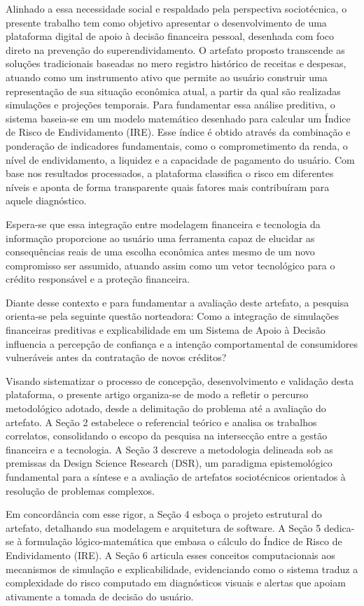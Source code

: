 \documentclass[portuguese]{sbc2025}%
\begin{document}
Alinhado a essa necessidade social e respaldado pela perspectiva sociotécnica, o presente trabalho tem como objetivo apresentar o desenvolvimento de uma plataforma digital de apoio à decisão financeira pessoal, desenhada com foco direto na prevenção do superendividamento. O artefato proposto transcende as soluções tradicionais baseadas no mero registro histórico de receitas e despesas, atuando como um instrumento ativo que permite ao usuário construir uma representação de sua situação econômica atual, a partir da qual são realizadas simulações e projeções temporais.
Para fundamentar essa análise preditiva, o sistema baseia-se em um modelo matemático desenhado para calcular um Índice de Risco de Endividamento (IRE). Esse índice é obtido através da combinação e ponderação de indicadores fundamentais, como o comprometimento da renda, o nível de endividamento, a liquidez e a capacidade de pagamento do usuário. Com base nos resultados processados, a plataforma classifica o risco em diferentes níveis e aponta de forma transparente quais fatores mais contribuíram para aquele diagnóstico.

Espera-se que essa integração entre modelagem financeira e tecnologia da informação proporcione ao usuário uma ferramenta capaz de elucidar as consequências reais de uma escolha econômica antes mesmo de um novo compromisso ser assumido, atuando assim como um vetor tecnológico para o crédito responsável e a proteção financeira.

Diante desse contexto e para fundamentar a avaliação deste artefato, a pesquisa orienta-se pela seguinte questão norteadora: Como a integração de simulações financeiras preditivas e explicabilidade em um Sistema de Apoio à Decisão influencia a percepção de confiança e a intenção comportamental de consumidores vulneráveis antes da contratação de novos créditos?

Visando sistematizar o processo de concepção, desenvolvimento e validação desta plataforma, o presente artigo organiza-se de modo a refletir o percurso metodológico adotado, desde a delimitação do problema até a avaliação do artefato. A Seção 2 estabelece o referencial teórico e analisa os trabalhos correlatos, consolidando o escopo da pesquisa na intersecção entre a gestão financeira e a tecnologia. A Seção 3 descreve a metodologia delineada sob as premissas da Design Science Research (DSR), um paradigma epistemológico fundamental para a síntese e a avaliação de artefatos sociotécnicos orientados à resolução de problemas complexos.

Em concordância com esse rigor, a Seção 4 esboça o projeto estrutural do artefato, detalhando sua modelagem e arquitetura de software. A Seção 5 dedica-se à formulação lógico-matemática que embasa o cálculo do Índice de Risco de Endividamento (IRE). A Seção 6 articula esses conceitos computacionais aos mecanismos de simulação e explicabilidade, evidenciando como o sistema traduz a complexidade do risco computado em diagnósticos visuais e alertas que apoiam ativamente a tomada de decisão do usuário.
\end{document}
